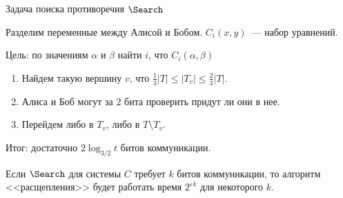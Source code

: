 \begin{frame}{Задача поиска противоречия $\Search$}

    Разделим переменные между Алисой и Бобом. $C_i(x, y)$~--- набор уравнений.
    
    Цель: по значениям $\alpha$ и $\beta$ найти $i$, что $C_i(\alpha, \beta)$

    \pause
    \vspace{0.2cm}
    \begin{minipage}{0.5\linewidth}
        \centering
        
    \end{minipage}
    \pause
    \begin{minipage}{0.48\linewidth}
        \begin{enumerate}
            \item Найдем такую вершину $v$, что $\frac{1}{3} |T| \le |T_v| \le \frac{2}{3} |T|$.
                \pause
                \pause
                \pause
                \pause
                \pause
            \item Алиса и Боб могут за $2$ бита проверить придут ли они в нее.
                \pause
                \pause
            \item Перейдем либо в $T_v$, либо в $T \setminus T_v$.
        \end{enumerate}
        \pause
        Итог: достаточно $2 \log_{3 / 2} t$ битов коммуникации.
    \end{minipage}
    
    \pause

    \begin{theorem}
        Если $\Search$ для системы $C$ требует $k$ битов коммуникации, то алгоритм <<расщепления>> будет
        работать время $2^{\varepsilon k}$ для некоторого $k$.
    \end{theorem}
\end{frame}